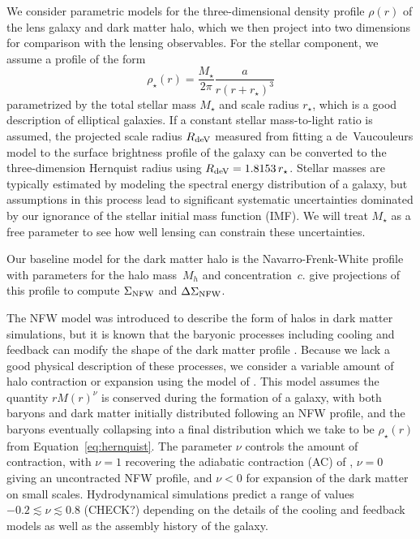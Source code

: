 \documentclass[12pt]{emulateapj}
\begin{document}
We consider parametric models for the three-dimensional density
profile $\rho(r)$ of the lens galaxy and dark matter halo, which we
then project into two dimensions for comparison with the lensing
observables. For the stellar component, we assume a
\citet{Hernquist1990} profile of the form
\begin{equation}
\rho_{\star}(r) = \frac{M_{\star}}{2\pi} \frac{a}{r(r+r_{\star})^3}
\label{eq:hernquist}
\end{equation}
parametrized by the total stellar mass $M_{\star}$ and scale radius
$r_{\star}$, which is a good description of elliptical galaxies. If a
constant stellar mass-to-light ratio is assumed, the 
projected scale radius $R_{\rm deV}$ measured from fitting a
de~Vaucouleurs model to the surface brightness profile of the galaxy
can be converted to the three-dimension Hernquist radius using $R_{\rm
  deV}=1.8153\,r_{\star}$. Stellar masses are typically
estimated by modeling the spectral energy distribution of a galaxy,
but assumptions in this process lead to significant systematic
uncertainties dominated by our ignorance of the stellar initial mass
function (IMF). We will treat $M_{\star}$ as a free parameter to
see how well lensing can constrain these uncertainties.

Our baseline model for the dark matter halo is the Navarro-Frenk-White
\citep[NFW, ][]{Navarro1996} profile with parameters for the halo
mass~$M_{h}$ and concentration~$c$. \citet{Wright2000} give
projections of this profile to compute $\Sigma_{\rm NFW}$ and
$\Delta\Sigma_{\rm NFW}$.

The NFW model was introduced to describe the form of halos in dark
matter simulations, but it is known that the baryonic processes
including cooling and feedback can modify the shape of the dark matter
profile \citep[e.g.,][]{Blumenthal1986, Gao2004, Gnedin2004,
  Johansson2009, Abadi2010, Gnedin2011}. Because we lack a good
physical description of these processes, we consider a variable amount
of halo contraction or expansion using the model of
\citet{Dutton2007}. This model assumes the quantity $rM(r)^\nu$ is
conserved during the formation of a galaxy, with both baryons and dark
matter initially distributed following an NFW profile, and the baryons
eventually collapsing into a final distribution which we take to be
$\rho_{\star}(r)$ from Equation~\ref{eq:hernquist}. The parameter
$\nu$ controls the amount of contraction, with $\nu=1$ recovering the
adiabatic contraction (AC) of \citet{Blumenthal1986}, $\nu=0$ giving an
uncontracted NFW profile, and $\nu<0$ for expansion of the dark matter
on small scales. Hydrodynamical simulations predict a range of values
$-0.2\lesssim \nu \lesssim 0.8$ (CHECK?) depending on the details of
the cooling and feedback models as well as the assembly history of the
galaxy.
\end{document}
